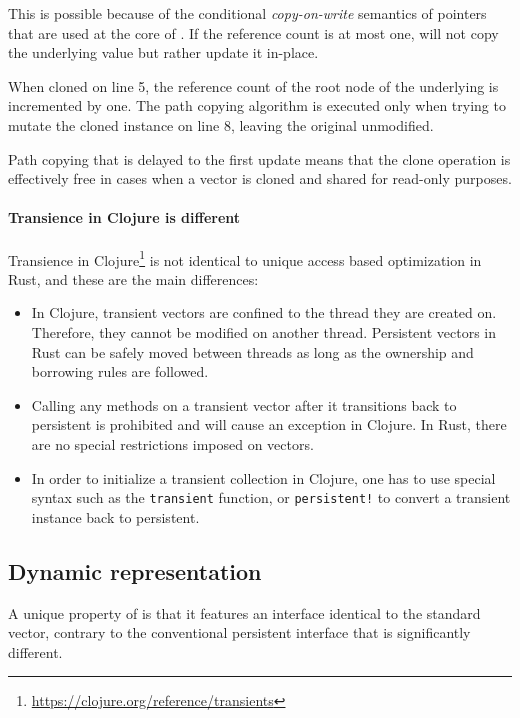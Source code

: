 This is possible because of the conditional \emph{copy-on-write} semantics of \rc{} pointers that are used at the core of \rrbtree{}. If the reference count is at most one,  will not copy the underlying value but rather update it in-place.

When cloned on line 5, the reference count of the root node of the underlying \rrbtree{} is incremented by one. The path copying algorithm is executed only when trying to mutate the cloned instance on line 8, leaving the original  unmodified.

Path copying that is delayed to the first update means that the clone operation is effectively free in cases when a vector is cloned and shared for read-only purposes.

\paragraph{Transience in Clojure is different}
Transience in Clojure\footnote{\url{https://clojure.org/reference/transients}} is not identical to unique access based optimization in Rust, and these are the main differences:

\begin{itemize}
    \item In Clojure, transient vectors are confined to the thread they are created on. Therefore, they cannot be modified on another thread. Persistent vectors in Rust can be safely moved between threads as long as the ownership and borrowing rules are followed.
    \item Calling any methods on a transient vector after it transitions back to persistent is prohibited and will cause an exception in Clojure. In Rust, there are no special restrictions imposed on vectors.
    \item In order to initialize a transient collection in Clojure, one has to use special syntax such as the \texttt{transient} function, or \texttt{persistent!} to convert a transient instance back to persistent.
\end{itemize}

\subsection{Dynamic representation}
A unique property of \pvec{} is that it features an interface identical to the standard vector, contrary to the conventional persistent interface that is significantly different.

